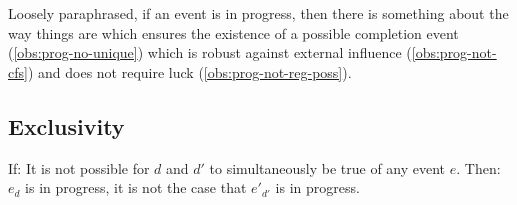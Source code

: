 \begin{note}
  \noindent%
  Loosely paraphrased, if an event is in progress, then there is something about the way things are which ensures the existence of a possible completion event (\autoref{obs:prog-no-unique}) which is robust against external influence (\autoref{obs:prog-not-cfs}) and does not require luck (\autoref{obs:prog-not-reg-poss}).
\end{note}



\subsection{Exclusivity}
\label{sec:events-progr-addit}


\begin{note}
  \begin{assumption}[Exclusivity]
    \label{assu:p:ex}
    If: It is not possible for \(d\) and \(d'\) to simultaneously be true of any event \(e\).
    Then: \(e_{d}\) is in progress, it is not the case that \(e'_{d'}\) is in progress.
  \end{assumption}
\end{note}



\subsection{}

